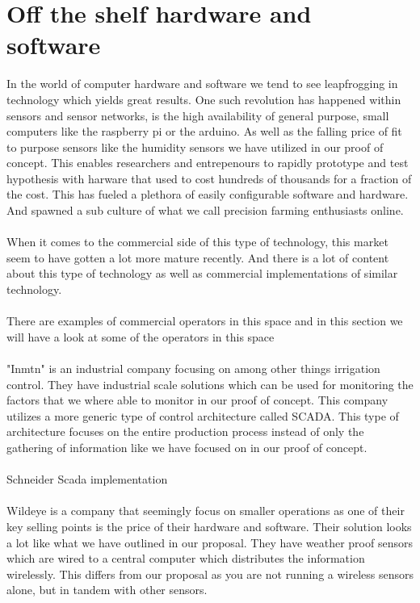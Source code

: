 \documentclass[]{uiophd}
\begin{document}
\section{Off the shelf hardware and software}
In the world of computer hardware and software we tend to see leapfrogging in technology which yields great results. One such revolution has happened within sensors and sensor networks, is the high availability of general purpose, small computers like the raspberry pi or the arduino. As well as the falling price of fit to purpose sensors like the humidity sensors we have utilized in our proof of concept. This enables researchers and entrepenours to rapidly prototype and test hypothesis with harware that used to cost hundreds of thousands for a fraction of the cost. This has fueled a plethora of easily configurable software and hardware. And spawned a sub culture of what we call precision farming enthusiasts online. 
\\\\
When it comes to the commercial side of this type of technology, this market seem to have gotten a lot more mature recently. And there is a lot of content about this type of technology as well as commercial implementations of similar technology.
\\\\
There are examples of commercial operators in this space and in this section we will have a look at some of the operators in this space
\\\\
"Inmtn" is an industrial company focusing on among other things irrigation control. They have industrial scale solutions which can be used for monitoring the factors that we where able to monitor in our proof of concept. This company utilizes a more generic type of control architecture called SCADA. This type of architecture focuses on the entire production process instead of only the gathering of information like we have focused on in our proof of concept.
\\\\
Schneider Scada implementation
\\\\
Wildeye is a company that seemingly focus on smaller operations as one of their key selling points is the price of their hardware and software. Their solution looks a lot like what we have outlined in our proposal. They have weather proof sensors which are wired to a central computer which distributes the information wirelessly. This differs from our proposal as you are not running a wireless sensors alone, but in tandem with other sensors. 
\\\\
\end{document}
